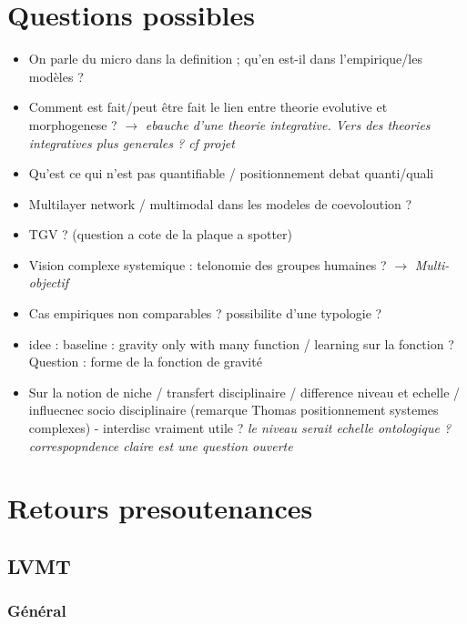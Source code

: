 \documentclass[11pt]{article}
\begin{document}
\section*{Questions possibles}

\begin{itemize}
	\item On parle du micro dans la definition ; qu'en est-il dans l'empirique/les modèles ?
	\item Comment est fait/peut être fait le lien entre theorie evolutive et morphogenese ? $\rightarrow$ \textit{ebauche d'une theorie integrative. Vers des theories integratives plus generales ? cf projet}
	\item Qu'est ce qui n'est pas quantifiable / positionnement debat quanti/quali
	\item Multilayer network / multimodal dans les modeles de coevoloution ?
	\item TGV ? (question a cote de la plaque a spotter)
	\item Vision complexe systemique : telonomie des groupes humaines ? $\rightarrow$ \textit{Multi-objectif}
	\item Cas empiriques non comparables ? possibilite d'une typologie ?
	\item idee : baseline : gravity only with many function / learning sur la fonction ? Question : forme de la fonction de gravité
	\item Sur la notion de niche / transfert disciplinaire / difference niveau et echelle / influecnec socio disciplinaire (remarque Thomas positionnement systemes complexes) - interdisc vraiment utile ? \textit{le niveau serait echelle ontologique ? correspopndence claire est une question ouverte}
\end{itemize}






\section*{Retours presoutenances}


\subsection*{LVMT}

\subsubsection*{Général}
\end{document}
